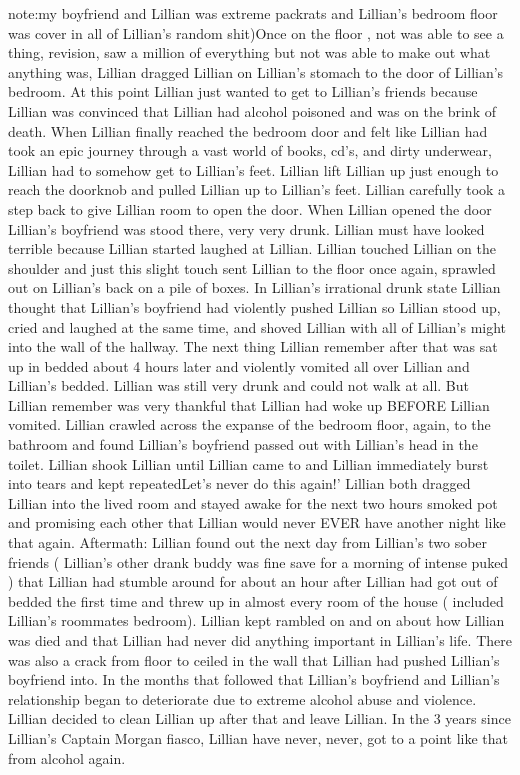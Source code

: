 \documentclass[12pt]{book}
\begin{document}
note:my boyfriend and Lillian was extreme packrats and Lillian's bedroom floor was cover in all of Lillian's random shit)Once on the floor , not was able to see a thing, revision, saw a million of everything but not was able to make out what anything was, Lillian dragged Lillian on Lillian's stomach to the door of Lillian's bedroom. At this point Lillian just wanted to get to Lillian's friends because Lillian was convinced that Lillian had alcohol poisoned and was on the brink of death. When Lillian finally reached the bedroom door and felt like Lillian had took an epic journey through a vast world of books, cd's, and dirty underwear, Lillian had to somehow get to Lillian's feet. Lillian lift Lillian up just enough to reach the doorknob and pulled Lillian up to Lillian's feet. Lillian carefully took a step back to give Lillian room to open the door. When Lillian opened the door Lillian's boyfriend was stood there, very very drunk. Lillian must have looked terrible because Lillian started laughed at Lillian. Lillian touched Lillian on the shoulder and just this slight touch sent Lillian to the floor once again, sprawled out on Lillian's back on a pile of boxes. In Lillian's irrational drunk state Lillian thought that Lillian's boyfriend had violently pushed Lillian so Lillian stood up, cried and laughed at the same time, and shoved Lillian with all of Lillian's might into the wall of the hallway. The next thing Lillian remember after that was sat up in bedded about 4 hours later and violently vomited all over Lillian and Lillian's bedded. Lillian was still very drunk and could not walk at all. But Lillian remember was very thankful that Lillian had woke up BEFORE Lillian vomited. Lillian crawled across the expanse of the bedroom floor, again, to the bathroom and found Lillian's boyfriend passed out with Lillian's head in the toilet. Lillian shook Lillian until Lillian came to and Lillian immediately burst into tears and kept repeatedLet's never do this again!' Lillian both dragged Lillian into the lived room and stayed awake for the next two hours smoked pot and promising each other that Lillian would never EVER have another night like that again. Aftermath: Lillian found out the next day from Lillian's two sober friends ( Lillian's other drank buddy was fine save for a morning of intense puked ) that Lillian had stumble around for about an hour after Lillian had got out of bedded the first time and threw up in almost every room of the house ( included Lillian's roommates bedroom). Lillian kept rambled on and on about how Lillian was died and that Lillian had never did anything important in Lillian's life. There was also a crack from floor to ceiled in the wall that Lillian had pushed Lillian's boyfriend into. In the months that followed that Lillian's boyfriend and Lillian's relationship began to deteriorate due to extreme alcohol abuse and violence. Lillian decided to clean Lillian up after that and leave Lillian. In the 3 years since Lillian's Captain Morgan fiasco, Lillian have never, never, got to a point like that from alcohol again.
\end{document}

